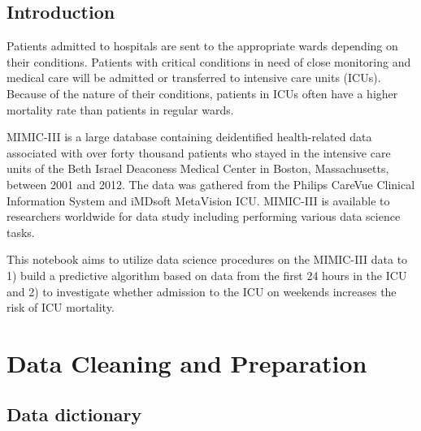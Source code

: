 \documentclass[
]{article}
\begin{document}
\hypertarget{introduction-1}{%
\subsection{Introduction}\label{introduction-1}}

Patients admitted to hospitals are sent to the appropriate wards
depending on their conditions. Patients with critical conditions in need
of close monitoring and medical care will be admitted or transferred to
intensive care units (ICUs). Because of the nature of their conditions,
patients in ICUs often have a higher mortality rate than patients in
regular wards.

MIMIC-III is a large database containing deidentified health-related
data associated with over forty thousand patients who stayed in the
intensive care units of the Beth Israel Deaconess Medical Center in
Boston, Massachusetts, between 2001 and 2012. The data was gathered from
the Philips CareVue Clinical Information System and iMDsoft MetaVision
ICU. MIMIC-III is available to researchers worldwide for data study
including performing various data science tasks.

This notebook aims to utilize data science procedures on the MIMIC-III
data to 1) build a predictive algorithm based on data from the first 24
hours in the ICU and 2) to investigate whether admission to the ICU on
weekends increases the risk of ICU mortality.

\hypertarget{data-cleaning-and-preparation}{%
\section{Data Cleaning and
Preparation}\label{data-cleaning-and-preparation}}

\hypertarget{data-dictionary}{%
\subsection{Data dictionary}\label{data-dictionary}}
\end{document}
